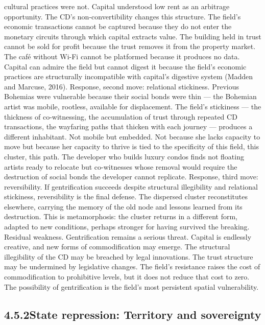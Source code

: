 cultural practices were not. Capital understood low rent as an arbitrage opportunity. The CD’s non-convertibility changes this structure. The field’s economic transactions cannot be captured because they do not enter the monetary circuits through which capital extracts value. The building held in trust cannot be sold for profit because the trust removes it from the property market. The café without Wi-Fi cannot be platformed because it produces no data. Capital can admire the field but cannot digest it because the field’s economic practices are structurally incompatible with capital’s digestive system (Madden and Marcuse, 2016). Response, second move: relational stickiness. Previous Bohemias were vulnerable because their social bonds were thin — the Bohemian artist was mobile, rootless, available for displacement. The field’s stickiness — the thickness of co-witnessing, the accumulation of trust through repeated CD transactions, the wayfaring paths that thicken with each journey — produces a different inhabitant. Not mobile but embedded. Not because she lacks capacity to move but because her capacity to thrive is tied to the specificity of this field, this cluster, this path. The developer who builds luxury condos finds not floating artists ready to relocate but co-witnesses whose removal would require the destruction of social bonds the developer cannot replicate. Response, third move: reversibility. If gentrification succeeds despite structural illegibility and relational stickiness, reversibility is the final defense. The dispersed cluster reconstitutes elsewhere, carrying the memory of the old node and lessons learned from its destruction. This is metamorphosis: the cluster returns in a different form, adapted to new conditions, perhaps stronger for having survived the breaking. Residual weakness. Gentrification remains a serious threat. Capital is endlessly creative, and new forms of commodification may emerge. The structural illegibility of the CD may be breached by legal innovations. The trust structure may be undermined by legislative changes. The field’s resistance raises the cost of commodification to prohibitive levels, but it does not reduce that cost to zero. The possibility of gentrification is the field’s most persistent spatial vulnerability.

\subsection{4.5.2\quad State repression: Territory and sovereignty}

